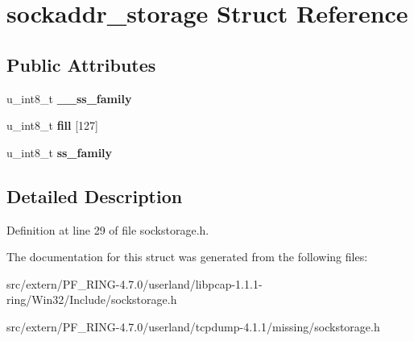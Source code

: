 \hypertarget{structsockaddr__storage}{
\section{sockaddr\_\-storage Struct Reference}
\label{structsockaddr__storage}
}
\subsection*{Public Attributes}
\begin{DoxyCompactItemize}
\item 
\hypertarget{structsockaddr__storage_a793c55c355f9dfef939d8116d09b980d}{
u\_\-int8\_\-t {\bfseries \_\-\_\-ss\_\-family}}
\label{structsockaddr__storage_a793c55c355f9dfef939d8116d09b980d}

\item 
\hypertarget{structsockaddr__storage_ae8d89c03ab4853263909d39dda4d28b6}{
u\_\-int8\_\-t {\bfseries fill} \mbox{[}127\mbox{]}}
\label{structsockaddr__storage_ae8d89c03ab4853263909d39dda4d28b6}

\item 
\hypertarget{structsockaddr__storage_acf7139ae55bb0e7463d8edcd13ca5f27}{
u\_\-int8\_\-t {\bfseries ss\_\-family}}
\label{structsockaddr__storage_acf7139ae55bb0e7463d8edcd13ca5f27}

\end{DoxyCompactItemize}


\subsection{Detailed Description}


Definition at line 29 of file sockstorage.h.



The documentation for this struct was generated from the following files:\begin{DoxyCompactItemize}
\item 
src/extern/PF\_\-RING-\/4.7.0/userland/libpcap-\/1.1.1-\/ring/Win32/Include/sockstorage.h\item 
src/extern/PF\_\-RING-\/4.7.0/userland/tcpdump-\/4.1.1/missing/sockstorage.h\end{DoxyCompactItemize}
